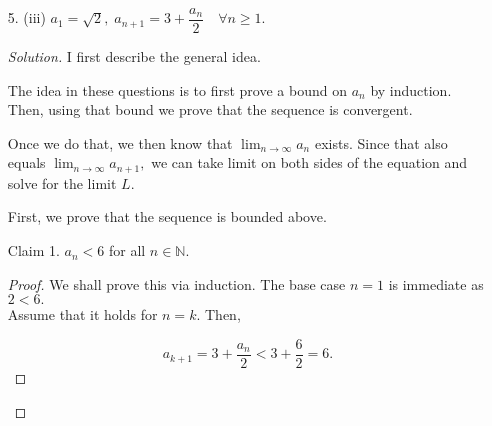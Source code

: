 \documentclass[12pt]{article}
\theoremstyle{definition}
\newenvironment{blockquote}
{\begin{mdframed}[skipabove=0pt, skipbelow=0pt, innertopmargin=4pt, innerbottommargin=4pt, bottomline=false,topline=false,rightline=false, linewidth=2pt]}
{\end{mdframed}}
\newenvironment{soln}{\begin{proof}[Solution]}{\end{proof}}
\begin{document}
\begin{itemize}[leftmargin=*]
\begin{soln}
	Then, $b_n$ is given as
	\begin{align*} 
		b_n &= (-1)^{n+1}\left(\dfrac{1}{2} - \dfrac{1}{n+1}\right) - (-1)^n\left(\dfrac{1}{2} - \dfrac{1}{n}\right)\\
		&= (-1)^{n+1}\left(\dfrac{1}{2} - \dfrac{1}{n+1}\right) + (-1)^{n+1}\left(\dfrac{1}{2} - \dfrac{1}{n}\right)\\
		&= (-1)^{n+1} + (-1)^{n}\left(\dfrac{1}{n+1} + \dfrac{1}{n}\right).
	\end{align*}
	Thus, we have
	\begin{align*} 
		|b_n| &= \left|1 - \left(\dfrac{1}{n+1} + \dfrac{1}{n}\right)\right|\\
		&= \left|1 - \dfrac{2n + 1}{n(n + 1)}\right|
	\end{align*}
	From the above, we conclude that
	\begin{equation*} 
		\lim_{n\to \infty}|b_n| = 1.
	\end{equation*}
	This shows that $a_n$ does not converge.
	\end{soln}
	\newpage
	\item[5. (iii)] $a_1 = \sqrt{2},\;a_{n+1} = 3 + \dfrac{a_n}{2} \quad \forall n \ge 1.$
	\begin{soln}
		I first describe the general idea.\\

	\begin{blockquote}
		The idea in these questions is to first prove a bound on $a_n$ by induction. Then, using that bound we prove that the sequence is convergent.

		Once we do that, we then know that $\lim_{n\to \infty}a_n$ exists. Since that also equals $\lim_{n\to \infty}a_{n+1},$ we can take limit on both sides of the equation and solve for the limit $L.$
	\end{blockquote}

	First, we prove that the sequence is bounded above.\\

	\begin{blockquote}
	Claim 1. $a_n < 6$ for all $n \in \mathbb{N}.$ 
	\begin{proof} 
		We shall prove this via induction. The base case $n = 1$ is immediate as $2 < 6.$\\
		Assume that it holds for $n = k.$ Then,
		
		\begin{equation*} 
			a_{k+1} = 3 + \dfrac{a_n}{2} < 3 + \dfrac{6}{2} = 6.
		\end{equation*}


\end{proof}
\end{blockquote}
\end{soln}
\end{itemize}
\end{document}
